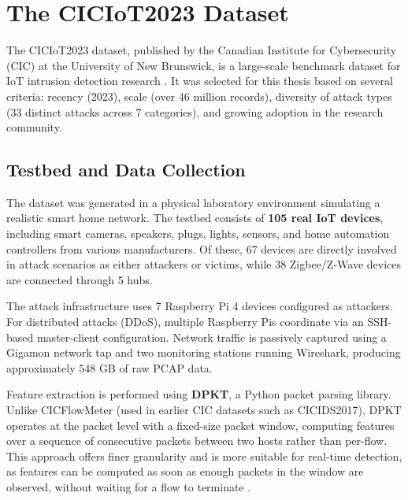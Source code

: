 \section{The CICIoT2023 Dataset}
\label{sec:ciciot2023}

\par The CICIoT2023 dataset, published by the Canadian Institute for Cybersecurity (CIC) at the University of New Brunswick, is a large-scale benchmark dataset for IoT intrusion detection research \cite{CICIoT2023}. It was selected for this thesis based on several criteria: recency (2023), scale (over 46 million records), diversity of attack types (33 distinct attacks across 7 categories), and growing adoption in the research community.

\subsection{Testbed and Data Collection}
\label{subsec:testbed}

\par The dataset was generated in a physical laboratory environment simulating a realistic smart home network. The testbed consists of \textbf{105 real IoT devices}, including smart cameras, speakers, plugs, lights, sensors, and home automation controllers from various manufacturers. Of these, 67 devices are directly involved in attack scenarios as either attackers or victims, while 38 Zigbee/Z-Wave devices are connected through 5 hubs.

\par The attack infrastructure uses 7 Raspberry Pi 4 devices configured as attackers. For distributed attacks (DDoS), multiple Raspberry Pis coordinate via an SSH-based master-client configuration. Network traffic is passively captured using a Gigamon network tap and two monitoring stations running Wireshark, producing approximately 548 GB of raw PCAP data.

\par Feature extraction is performed using \textbf{DPKT}, a Python packet parsing library. Unlike CICFlowMeter (used in earlier CIC datasets such as CICIDS2017), DPKT operates at the packet level with a fixed-size packet window, computing features over a sequence of consecutive packets between two hosts rather than per-flow. This approach offers finer granularity and is more suitable for real-time detection, as features can be computed as soon as enough packets in the window are observed, without waiting for a flow to terminate \cite{CICIoT2023}.

